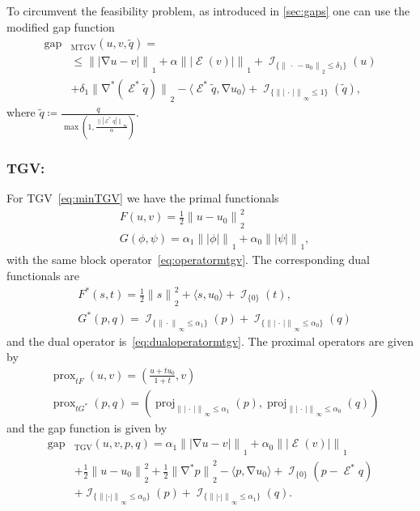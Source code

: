 \documentclass[twocolumn,envcountsame]{svjour3}
\newcommand{\norm}[2][]{{\|{#2}\|_{}}_{#1}}
\newcommand{\abs}[1]{|#1|}
\newcommand{\scp}[2]{\langle #1,#2\rangle}
\newcommand{\dummy}{\,\cdot\,}
\DeclareMathOperator{\ind}{\mathcal{I}}
\DeclareMathOperator{\prox}{prox}
\DeclareMathOperator{\proj}{proj}
\DeclareMathOperator{\gap}{gap}
\DeclareMathOperator{\grad}{\nabla}
\DeclareMathOperator{\symgrad}{\mathcal{E}}
\DeclareMathOperator{\TGV}{TGV}
\begin{document}
     To circumvent the feasibility problem, as introduced in \ref{sec:gaps} one can use the modified
     gap function
\begin{align*}
  \gap&_{\operatorname{MTGV}}(u,v,\tilde q)=\\
 &\leq \norm[1]{\abs{\grad u - v}} + 
		\alpha\norm[1]{\abs{\symgrad(v)}}
		+\ind_{\{\norm[2]{\dummy-u_0}\leq \delta_1\}}(u)\\
		&+\delta_1\norm[2]{\grad^* (\symgrad^*\tilde q)} - \langle \symgrad^*\tilde q, \grad
		u_0\rangle + \ind_{\{\norm[\infty]{\abs{\dummy}}\leq 1\}}(\tilde q),
		\end{align*}
		where $\tilde
		q\coloneqq\frac{q}{\max\left(1,\frac{\norm[\infty]{\abs{\symgrad^*q}}}{\alpha}\right)}$.

\subsubsection{TGV:}
For TGV~\eqref{eq:minTGV} we have the primal functionals
\begin{align*}
	&F(u,v)= \frac{1}{2}\norm[2]{u-u_0}^2\\
	&G(\phi,\psi)=\alpha_1\norm[1]{\abs{\phi}} + 
		\alpha_0\norm[1]{\abs{\psi}},
\end{align*}
with the same block operator~\eqref{eq:operatormtgv}. The corresponding dual functionals are
\begin{align*}
	&F^*(s,t) = \frac{1}{2}\norm[2]{s}^2 + \scp{s}{u_0}
			+ \ind_{\{0\}}(t),\\
	&G^*(p,q)=\ind_{\{\norm[\infty]{\cdot}\leq \alpha_1\}}(p)+ \ind_{\{\norm[\infty]{\abs{\dummy}}\leq
	\alpha_0\}}(q)
\end{align*}
and the dual operator is~\eqref{eq:dualoperatormtgv}. The proximal operators are given by
\begin{align*}
	&\prox_{t F}(u,v)=\left(\frac{u+tu_0}{1+t} ,v\right)\\
	&\prox_{t G^*}(p,q)=(\proj_{\norm[\infty]{\abs{\dummy}}\leq
	\alpha_1}(p),\proj_{\norm[\infty]{\abs{\dummy}}\leq \alpha_0}(q))
      \end{align*}
      and the gap function is given by
      \begin{align*}
     \gap&_{\TGV}(u,v,p,q)=
   \alpha_1\norm[1]{\abs{\grad u - v}} + 
		\alpha_0\norm[1]{\abs{\symgrad(v)}}\\
		&+\frac{1}{2}\norm[2]{u-u_0}^2
		+\frac{1}{2}\norm[2]{\grad^* p}^2 - \langle p, \grad u_0\rangle 
		+\ind_{\{0\}}(p - \symgrad^*q) \\
		&+\ind_{\{\norm[\infty]{\abs{\cdot}}\leq\alpha_0\}}(p) +
		\ind_{\{\norm[\infty]{\abs{\cdot}}\leq\alpha_1\}}(q).
	      \end{align*}
\end{document}
